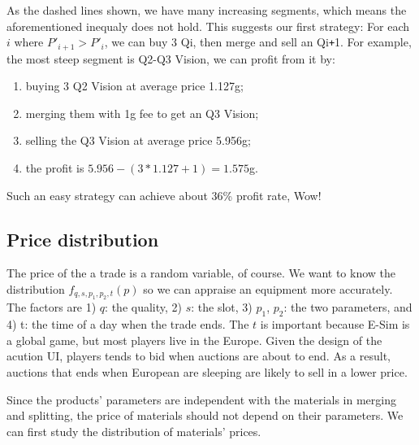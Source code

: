 \documentclass{manuscript}
\begin{document}
    As the dashed lines shown, we have many increasing segments, which means the aforementioned inequaly does not hold.
    This suggests our first strategy: For each $i$ where $P'_{i+1} > P'_i$, we can buy 3 Qi, then merge and sell an
    Qi\verb!+!1. For example, the most steep segment is Q2-Q3 Vision, we can profit from it by:
    \begin{enumerate}[nosep]
        \item buying 3 Q2 Vision at average price 1.127g;
        \item merging them with 1g fee to get an Q3 Vision;
        \item selling the Q3 Vision at average price 5.956g;
        \item the profit is $5.956 - (3 * 1.127 + 1) = 1.575$g.
    \end{enumerate}
    Such an easy strategy can achieve about 36\% profit rate, Wow!

    \subsection{Price distribution}

    The price of the a trade is a random variable, of course. We want to know the distribution $f_{q, s, p_1, p_2, t}(p)$ so
    we can appraise an equipment more accurately. The factors are 1) $q$: the quality, 2) $s$: the slot, 3) $p_1$, $p_2$:
    the two parameters, and 4) t: the time of a day when the trade ends. The $t$ is important because E-Sim is a global
    game, but most players live in the Europe. Given the design of the acution UI, players tends to bid when auctions are
    about to end. As a result, auctions that ends when European are sleeping are likely to sell in a lower price.

    Since the products' parameters are independent with the materials in merging and splitting, the price of materials
    should not depend on their parameters. We can first study the distribution of materials' prices.
\end{document}
